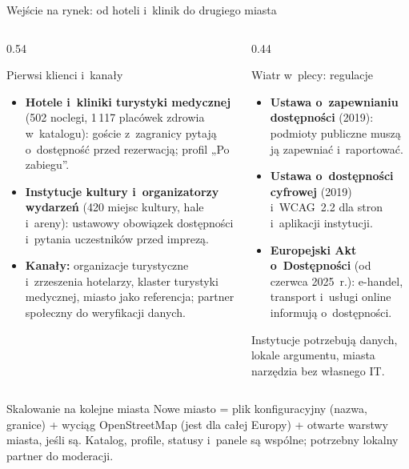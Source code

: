 \begin{frame}{Wejście na rynek: od hoteli i~klinik do drugiego miasta}
  \begin{columns}[T,onlytextwidth]
    \begin{column}{0.54\textwidth}
      \begin{block}{Pierwsi klienci i~kanały}
        \footnotesize
        \begin{itemize}
          \item \textbf{Hotele i~kliniki turystyki medycznej} (502 noclegi, 1\,117 placówek zdrowia w~katalogu):
                goście z~zagranicy pytają o~dostępność przed rezerwacją; profil „Po zabiegu”.
          \item \textbf{Instytucje kultury i~organizatorzy wydarzeń} (420 miejsc kultury, hale i~areny):
                ustawowy obowiązek dostępności i~pytania uczestników przed imprezą.
          \item \textbf{Kanały:} organizacje turystyczne i~zrzeszenia hotelarzy, klaster turystyki medycznej,
                miasto jako referencja; partner społeczny do weryfikacji danych.
        \end{itemize}
      \end{block}
    \end{column}
    \begin{column}{0.44\textwidth}
      \begin{alertblock}{Wiatr w~plecy: regulacje}
        \footnotesize
        \begin{itemize}
          \item \textbf{Ustawa o~zapewnianiu dostępności} (2019): podmioty publiczne muszą ją zapewniać i~raportować.
          \item \textbf{Ustawa o~dostępności cyfrowej} (2019) i~WCAG~2.2 dla stron i~aplikacji instytucji.
          \item \textbf{Europejski Akt o~Dostępności} (od czerwca 2025~r.): e-handel, transport i~usługi online
                informują o~dostępności.
        \end{itemize}
        \vspace{0.3mm}
        Instytucje potrzebują danych, lokale argumentu, miasta narzędzia bez własnego IT.
      \end{alertblock}
    \end{column}
  \end{columns}
  \vspace{1mm}
  \begin{exampleblock}{Skalowanie na kolejne miasta}
    \footnotesize
    Nowe miasto = plik konfiguracyjny (nazwa, granice) + wyciąg OpenStreetMap (jest dla całej Europy) + otwarte warstwy miasta, jeśli są.
    Katalog, profile, statusy i~panele są wspólne; potrzebny lokalny partner do moderacji.
  \end{exampleblock}


\end{frame}
